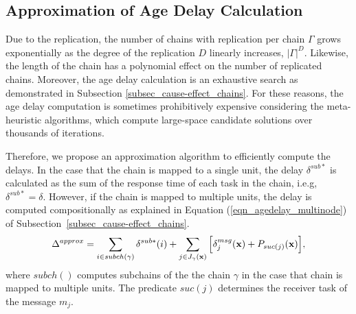 \subsection{Approximation of Age Delay Calculation}\label{subsec_approximation_alg}
Due to the replication, the number of chains with replication per chain $\Gamma$ grows exponentially as the degree of the replication $D$ linearly increases, $|\Gamma|^D$. Likewise, the length of the chain has a polynomial effect on the number of replicated chains. Moreover, the age delay calculation is an exhaustive search as demonstrated in Subsection \ref{subsec_cause-effect_chains}. For these reasons, the age delay computation is sometimes prohibitively expensive considering the meta-heuristic algorithms, which compute large-space candidate solutions over thousands of iterations. 

Therefore, we propose an approximation algorithm to efficiently compute the delays. In the case that the chain is mapped to a single unit, the delay $\delta^{sub*}$ is calculated as the sum of the response time of each task in the chain, i.e.g, $\delta^{sub*}=\delta$. However, if the chain is mapped to multiple units, the delay is computed compositionally as explained in Equation (\ref{eqn_agedelay_multinode}) of Subsection~\ref{subsec_cause-effect_chains}.
\begin{align}
\Delta^{approx}=\sum_{i\in subch(\gamma)}{\delta^{sub*}(i)}+\sum_{j\in J_{\gamma}(\textbf{x})}{\Big[\delta^{msg}_j(\textbf{x})+P_{suc(j)}(\textbf{x})\Big]},
\end{align}
where $subch()$ computes subchains of the the chain $\gamma$ in the case that chain is mapped to multiple units. The predicate $suc(j)$ determines the receiver task of the message $m_j$.


